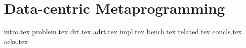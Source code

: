 \chapter{Data-centric Metaprogramming}
\label{chapter:ildl}

{intro.tex}
{problem.tex}
{drt.tex}
{adrt.tex}
{impl.tex}
{bench.tex}
{related.tex}
{concls.tex}
{acks.tex}
